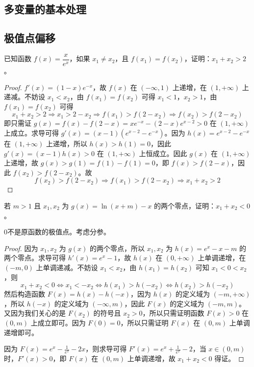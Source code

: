 \clearpage
\subsection{多变量的基本处理}
\clearpage
\subsection{极值点偏移}

\begin{example}[2010年天津理]
    已知函数 $f(x) = \dfrac{x}{e^x}$，如果 $x_1 \neq x_2$，且 $f(x_1) = f(x_2)$，证明：$x_1 + x_2 > 2$。
\end{example}

\begin{proof}
    $f'(x) = (1-x)e^{-x}$，故 $f(x)$ 在 $(-\infty, 1)$ 上递增，在 $(1, +\infty)$ 上递减。不妨设 $x_1 < x_2$，由 $f(x_1) = f(x_2)$ 可得 $x_1 < 1$，$x_2 > 1$，由 $f(x_1) = f(x_2)$ 可得
    \[
    x_1 + x_2 > 2 \Rightarrow x_1 > 2 - x_2 \Rightarrow f(x_1) > f(2 - x_2) \Rightarrow f(x_2) > f(2 - x_2)
    \]
    即只需证 $g(x) = f(x) - f(2-x) = xe^{-x} - (2-x)e^{x-2} > 0$ 在 $(1, +\infty)$ 上成立。求导可得 $g'(x) = (x-1)(e^{x-2} - e^{-x})$。因为 $h(x) = e^{x-2} - e^{-x}$ 在 $(1, +\infty)$ 上递增，所以 $h(x) > h(1) = 0$，因此 $g'(x) = (x-1)h(x) > 0$ 在 $(1, +\infty)$ 上恒成立。因此 $g(x)$ 在 $(1, +\infty)$ 上递增，故 $g(x) > g(1) = f(1) - f(1) = 0$，即 $f(x) > f(2-x)$，因此 $f(x_2) > f(2-x_2)$。故
    \[
    f(x_2) > f(2 - x_2) \Rightarrow f(x_1) > f(2 - x_2) \Rightarrow x_1 + x_2 > 2
    \]
    
\end{proof}


\begin{example}
    若 $m > 1$ 且 $x_1, x_2$ 为 $g(x) = \ln(x+m) - x$ 的两个零点，证明：$x_1 + x_2 < 0$。
\end{example}
\begin{analyse}
    \(0\)不是原函数的极值点。考虑分参。
\end{analyse}
\begin{proof}
    因为 $x_1, x_2$ 为 $g(x)$ 的两个零点，所以 $x_1, x_2$ 为 $h(x) = e^x - x - m$ 的两个零点。求导可得 $h'(x) = e^x - 1$，故 $h(x)$ 在 $(0, +\infty)$ 上单调递增，在 $(-m, 0)$ 上单调递减。不妨设 $x_1 < x_2$，由 $h(x_1) = h(x_2)$ 可知 $x_1 < 0 < x_2$
，则
\[
x_1 + x_2 < 0 
\Leftrightarrow x_1 < -x_2 \Leftrightarrow h(x_1) > h(-x_2) \Leftrightarrow
 h(x_2) > h(-x_2)
\]
然后构造函数 
$F(x) = h(x) - h(-x)$，因为 $h(x)$ 的定义域为 $(-m, +\infty)$，所以 $h(-x)$ 的定义域为 $(-\infty, m)$，因此 $F(x)$ 的定义域为 $(-m, m)$。又因为我们关心的是 $F(x_2)$ 的符号且 $x_2 > 0$，所以只需证明函数 $F(x) > 0$ 在 $(0, m)$ 上成立即可。因为 $F(0) = 0$，所以只需证明 $F(x)$ 在 $(0, m)$
 上单调递增即可。

因为 
$F(x) = e^x - \frac{1}{e^x} - 2x$，则求导可得 $F'(x) = e^x + \frac{1}{e^x} - 2$，当 $x \in (0, m)$ 时，$F'(x) > 0$，即 $F(x)$ 在 $(0, m)$ 上单调递增，故 $x_1 + x_2 < 0$
 得证。

\end{proof}

